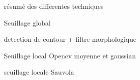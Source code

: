 %




résumé des differentes techniques 



Seuillage global

detection de contour + filtre morphologique 
     
Seuillage local Opencv moyenne et gaussian

seuillage locale Sauvola